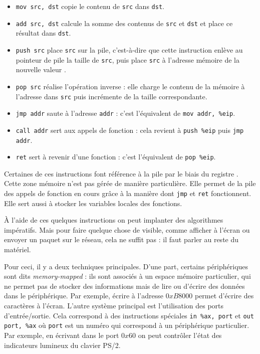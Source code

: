 \begin{itemize}

\item \texttt{mov src, dst} copie le contenu de \texttt{src} dans \texttt{dst}.

\item \texttt{add src, dst} calcule la somme des contenus de \texttt{src} et
  \texttt{dst} et place ce résultat dans \texttt{dst}.

\item \texttt{push src} place \texttt{src} sur la pile, c'est-à-dire que cette
  instruction enlève au pointeur de pile \esp la taille de \texttt{src}, puis
  place \texttt{src} à l'adresse mémoire de la nouvelle valeur \esp.

\item \texttt{pop src} réalise l'opération inverse : elle charge le contenu de
  la mémoire à l'adresse \esp dans \texttt{src} puis incrémente \esp de la
  taille correspondante.

\item \texttt{jmp addr} saute à l'adresse \texttt{addr} : c'est l'équivalent de
  \texttt{mov addr, \%eip}.

\item \texttt{call addr} sert aux appels de fonction : cela revient à
  \texttt{push \%eip} puis \texttt{jmp addr}.

\item \texttt{ret} sert à revenir d'une fonction : c'est l'équivalent de
  \texttt{pop \%eip}.

\end{itemize}

Certaines de ces instructions font référence à la pile par le biais du registre
\esp. Cette zone mémoire n'est pas gérée de manière particulière. Elle permet de
la pile des appels de fonction en cours grâce à la manière dont \texttt{jmp} et
\texttt{ret} fonctionnent. Elle sert aussi à stocker les variables locales des
fonctions.

À l'aide de ces quelques instructions on peut implanter des algorithmes
impératifs. Mais pour faire quelque chose de visible, comme afficher à l'écran
ou envoyer un paquet sur le réseau, cela ne suffit pas : il faut parler au reste
du matériel.

Pour ceci, il y a deux techniques principales. D'une part, certains
périphériques sont dits \emph{memory-mapped} : ils sont associés à un espace
mémoire particulier, qui ne permet pas de stocker des informations mais de lire
ou d'écrire des données dans le périphérique. Par exemple, écrire à l'adresse
$0xB8000$ permet d'écrire des caractères à l'écran. L'autre système principal
est l'utilisation des ports d'entrée/sortie. Cela correspond à des instructions
spéciales \texttt{in \%ax, port} et \texttt{out port, \%ax} où \texttt{port}
est un numéro qui correspond à un périphérique particulier. Par exemple, en
écrivant dans le port $0x60$ on peut contrôler l'état des indicateurs lumineux
du clavier PS/2.

